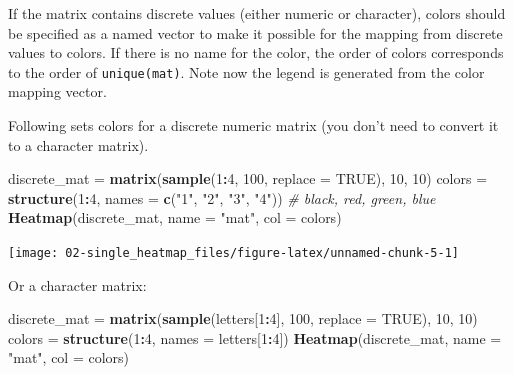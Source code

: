 \documentclass[]{book}
\newenvironment{Shaded}{\begin{snugshade}}{\end{snugshade}}
\newcommand{\KeywordTok}[1]{\textcolor[rgb]{0.13,0.29,0.53}{\textbf{#1}}}
\newcommand{\DataTypeTok}[1]{\textcolor[rgb]{0.13,0.29,0.53}{#1}}
\newcommand{\DecValTok}[1]{\textcolor[rgb]{0.00,0.00,0.81}{#1}}
\newcommand{\StringTok}[1]{\textcolor[rgb]{0.31,0.60,0.02}{#1}}
\newcommand{\CommentTok}[1]{\textcolor[rgb]{0.56,0.35,0.01}{\textit{#1}}}
\newcommand{\OtherTok}[1]{\textcolor[rgb]{0.56,0.35,0.01}{#1}}
\newcommand{\OperatorTok}[1]{\textcolor[rgb]{0.81,0.36,0.00}{\textbf{#1}}}
\newcommand{\NormalTok}[1]{#1}
\theoremstyle{definition}
\theoremstyle{definition}
\theoremstyle{definition}
\theoremstyle{remark}
\begin{document}
If the matrix contains discrete values (either numeric or character),
colors should be specified as a named vector to make it possible for the
mapping from discrete values to colors. If there is no name for the
color, the order of colors corresponds to the order of
\texttt{unique(mat)}. Note now the legend is generated from the color
mapping vector.

Following sets colors for a discrete numeric matrix (you don't need to
convert it to a character matrix).

\begin{Shaded}
\begin{Highlighting}[]
\NormalTok{discrete_mat =}\StringTok{ }\KeywordTok{matrix}\NormalTok{(}\KeywordTok{sample}\NormalTok{(}\DecValTok{1}\OperatorTok{:}\DecValTok{4}\NormalTok{, }\DecValTok{100}\NormalTok{, }\DataTypeTok{replace =} \OtherTok{TRUE}\NormalTok{), }\DecValTok{10}\NormalTok{, }\DecValTok{10}\NormalTok{)}
\NormalTok{colors =}\StringTok{ }\KeywordTok{structure}\NormalTok{(}\DecValTok{1}\OperatorTok{:}\DecValTok{4}\NormalTok{, }\DataTypeTok{names =} \KeywordTok{c}\NormalTok{(}\StringTok{"1"}\NormalTok{, }\StringTok{"2"}\NormalTok{, }\StringTok{"3"}\NormalTok{, }\StringTok{"4"}\NormalTok{)) }\CommentTok{# black, red, green, blue}
\KeywordTok{Heatmap}\NormalTok{(discrete_mat, }\DataTypeTok{name =} \StringTok{"mat"}\NormalTok{, }\DataTypeTok{col =}\NormalTok{ colors)}
\end{Highlighting}
\end{Shaded}

\begin{center}\texttt{[image: 02-single\_heatmap\_files/figure-latex/unnamed-chunk-5-1]} \end{center}

Or a character matrix:

\begin{Shaded}
\begin{Highlighting}[]
\NormalTok{discrete_mat =}\StringTok{ }\KeywordTok{matrix}\NormalTok{(}\KeywordTok{sample}\NormalTok{(letters[}\DecValTok{1}\OperatorTok{:}\DecValTok{4}\NormalTok{], }\DecValTok{100}\NormalTok{, }\DataTypeTok{replace =} \OtherTok{TRUE}\NormalTok{), }\DecValTok{10}\NormalTok{, }\DecValTok{10}\NormalTok{)}
\NormalTok{colors =}\StringTok{ }\KeywordTok{structure}\NormalTok{(}\DecValTok{1}\OperatorTok{:}\DecValTok{4}\NormalTok{, }\DataTypeTok{names =}\NormalTok{ letters[}\DecValTok{1}\OperatorTok{:}\DecValTok{4}\NormalTok{])}
\KeywordTok{Heatmap}\NormalTok{(discrete_mat, }\DataTypeTok{name =} \StringTok{"mat"}\NormalTok{, }\DataTypeTok{col =}\NormalTok{ colors)}
\end{Highlighting}
\end{Shaded}
\end{document}
